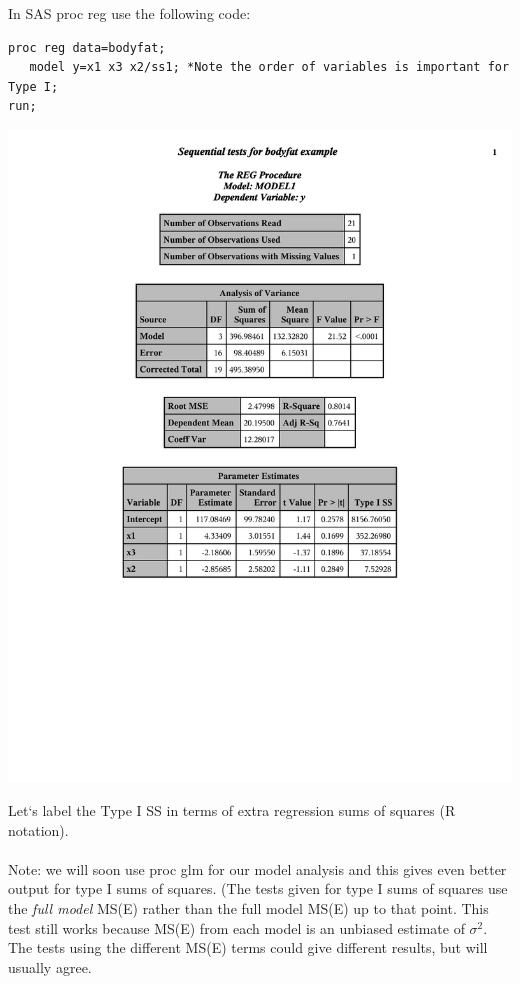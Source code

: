 \documentclass{article}
\begin{document}
In SAS proc reg use the following code:\\
\begin{small}
\begin{verbatim}
proc reg data=bodyfat;
   model y=x1 x3 x2/ss1; *Note the order of variables is important for Type I;  
run;
\end{verbatim}
\end{small}

\begin{center}
\includegraphics[page=1,scale=0.7,trim= 10mm 100mm 10mm 10mm]{bodyfatexampletypeI}
\end{center}

\newpage

Let`s label the Type I SS in terms of extra regression sums of squares (R notation).\\~\\

Note: we will soon use proc glm for our model analysis and this gives even better output for type I sums of squares.  (The tests given for type I sums of squares use the \textit{full model} MS(E) rather than the full model MS(E) up to that point.  This test still works because MS(E) from each model is an unbiased estimate of $\sigma^2$.  The tests using the different MS(E) terms could give different results, but will usually agree.\\~\\
\end{document}
